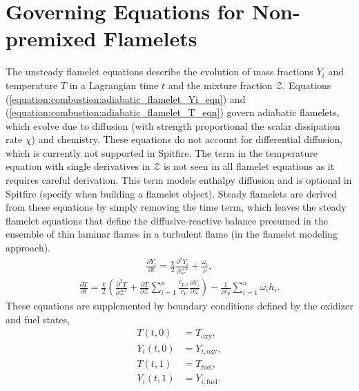 \documentclass[letterpaper,10pt,english]{sphinxmanual}
\begin{document}
\section{Governing Equations for Non-premixed Flamelets}
\label{\detokenize{combustion:governing-equations-for-non-premixed-flamelets}}
The unsteady flamelet equations describe the evolution of mass fractions \(Y_i\) and temperature \(T\)
in a Lagrangian time \(t\) and the mixture fraction \(\mathcal{Z}\).
Equations (\ref{equation:combustion:adiabatic_flamelet_Yi_eqn}) and (\ref{equation:combustion:adiabatic_flamelet_T_eqn}) govern adiabatic flamelets,
which evolve due to diffusion (with strength proportional the scalar dissipation rate \(\chi\)) and chemistry.
These equations do not account for differential diffusion, which is currently not supported in Spitfire.
The term in the temperature equation with single derivatives in \(\mathcal{Z}\) is not seen in all flamelet
equations as it requires careful derivation.
This term models enthalpy diffusion and is optional in Spitfire (specify  when building a flamelet object).
Steady flamelets are derived from these equations by simply removing the time term, which leaves the steady flamelet equations
that define the diffusive-reactive balance presumed in the ensemble of thin laminar flames in a turbulent flame (in the flamelet modeling approach).
\begin{equation}\label{equation:combustion:adiabatic_flamelet_Yi_eqn}
\begin{split}\frac{\partial Y_i}{\partial t} = \frac{\chi}{2}\frac{\partial^2 Y_i}{\partial \mathcal{Z}^2} + \frac{\omega_i}{\rho},\end{split}
\end{equation}\begin{equation}\label{equation:combustion:adiabatic_flamelet_T_eqn}
\begin{split}\frac{\partial T}{\partial t} = \frac{\chi}{2}\left(\frac{\partial^2 T}{\partial \mathcal{Z}^2} + \frac{\partial T}{\partial \mathcal{Z}}\sum_{i=1}^{n}\frac{c_{p,i}}{c_p}\frac{\partial Y_i}{\partial \mathcal{Z}}\right) - \frac{1}{\rho c_p}\sum_{i=1}^{n}\omega_i h_i.\end{split}
\end{equation}
These equations are supplemented by boundary conditions defined by the oxidizer and fuel states,
\begin{equation}\label{equation:combustion:combustion:0}
\begin{split}T(t, 0) &= T_{\mathrm{oxy}}, \\
Y_i(t, 0) &= Y_{i,\mathrm{oxy}}, \\
T(t, 1) &= T_{\mathrm{fuel}}, \\
Y_i(t, 1) &= Y_{i,\mathrm{fuel}}.\end{split}
\end{equation}
\end{document}
